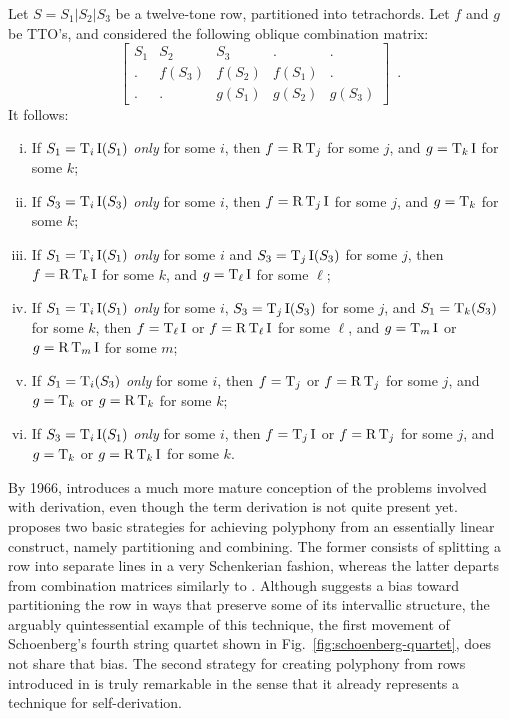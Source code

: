 \begin{example}
	\cite[241]{Martino1961}
	\label{ex:oblique}
	Let $S = S_1 | S_2 | S_3$ be a twelve-tone row, partitioned into tetrachords. Let $f$ and $g$ be TTO's, and considered the following oblique combination matrix:
	\begin{equation}
    	\left[
    	\begin{array}{c|c|c|c|c}
        	S_1 & S_2 & S_3 & . & . \\
        	. & f(S_3) & f(S_2) & f(S_1) & . \\
        	. & . & g(S_1) & g(S_2) & g(S_3)
    	\end{array}
    	\right] \enspace.
	\end{equation}
	It follows:
	\begin{enumerate}[i.]
		\item If $S_1 = \operatorname{T}_i\operatorname{I}(S_1)$ \emph{only} for some $i$, then $f = \operatorname{R}\operatorname{T}_j$ for some $j$, and $g = \operatorname{T}_k\operatorname{I}$ for some $k$;
		\item If $S_3 = \operatorname{T}_i\operatorname{I}(S_3)$ \emph{only} for some $i$, then $f = \operatorname{R}\operatorname{T}_j\operatorname{I}$ for some $j$, and $g = \operatorname{T}_k$ for some $k$;
		\item If $S_1 = \operatorname{T}_i\operatorname{I}(S_1)$ \emph{only} for some $i$ and $S_3 = \operatorname{T}_j\operatorname{I}(S_3)$ for some $j$, then $f = \operatorname{R}\operatorname{T}_k\operatorname{I}$ for some $k$, and $g = \operatorname{T}_\ell\operatorname{I}$ for some $\ell$;
		\item If $S_1 = \operatorname{T}_i\operatorname{I}(S_1)$ \emph{only} for some $i$, $S_3 = \operatorname{T}_j\operatorname{I}(S_3)$ for some $j$, and $S_1 = \operatorname{T}_k(S_3)$ for some $k$, then $f = \operatorname{T}_\ell\operatorname{I}$ or $f = \operatorname{R}\operatorname{T}_\ell\operatorname{I}$ for some $\ell$, and $g = \operatorname{T}_m\operatorname{I}$ or $g = \operatorname{R}\operatorname{T}_m\operatorname{I}$ for some $m$;
		\item If $S_1 = \operatorname{T}_i(S_3)$ \emph{only} for some $i$, then $f = \operatorname{T}_j$ or $f = \operatorname{R}\operatorname{T}_j$ for some $j$, and $g = \operatorname{T}_k$ or $g = \operatorname{R}\operatorname{T}_k$ for some $k$;
		\item If $S_3 = \operatorname{T}_i\operatorname{I}(S_1)$ \emph{only} for some $i$, then $f = \operatorname{T}_j\operatorname{I}$ or $f = \operatorname{R}\operatorname{T}_j$ for some $j$, and $g = \operatorname{T}_k$ or $g = \operatorname{R}\operatorname{T}_k\operatorname{I}$ for some $k$.
	\end{enumerate}
\end{example}


By 1966, \cite{Westergaard1966} introduces a much more mature conception of the problems involved with derivation, even though the term derivation is not quite present yet. \cite[95]{Westergaard1966} proposes two basic strategies for achieving polyphony from an essentially linear construct, namely partitioning and combining. The former consists of splitting a row into separate lines in a very Schenkerian fashion, whereas the latter departs from combination matrices similarly to \cite{Martino1961}. Although \cite[100]{Westergaard1966} suggests a bias toward partitioning the row in ways that preserve some of its intervallic structure, the arguably quintessential example of this technique, the first movement of Schoenberg's fourth string quartet shown in Fig.~\ref{fig:schoenberg-quartet}, does not share that bias. The second strategy for creating polyphony from rows introduced in \cite[101]{Westergaard1966} is truly remarkable in the sense that it already represents a technique for self-derivation.

